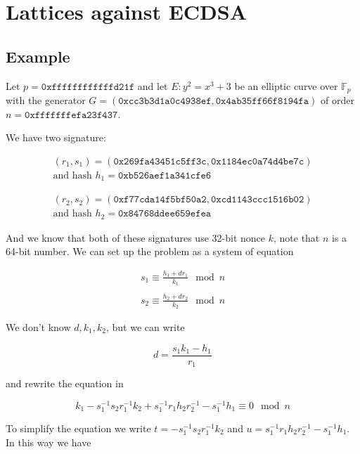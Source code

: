 \documentclass[a4paper,12pt]{report}
\newcommand{\F}{\mathbb{F}}
\begin{document}
\section{Lattices against ECDSA}

\subsection{Example}

Let $p = \texttt{0xffffffffffffd21f}$ and let $E: y^2 = x^3 + 3$ be an elliptic curve over $\F_p$ with the generator
$G = (\texttt{0xcc3b3d1a0c4938ef}, \texttt{0x4ab35ff66f8194fa})$ of order $n = \texttt{0xfffffffefa23f437}$.

\vspace*{10px}

We have two signature:

\[
    \begin{array}{c}
        (r_1, s_1) = (\texttt{0x269fa43451c5ff3c}, \texttt{0x1184ec0a74d4be7c}) \\
        \text{and hash } h_1 = \texttt{0xb526aef1a341cfe6}
    \end{array}
\]

\[
    \begin{array}{c}
        (r_2, s_2) = (\texttt{0xf77cda14f5bf50a2}, \texttt{0xcd1143ccc1516b02}) \\ 
        \text{and hash } h_2 = \texttt{0x84768ddee659efea}
    \end{array}
\]

And we know that both of these signatures use 32-bit nonce $k$, note that $n$ is a 64-bit number. We can set up the problem as a system of equation

\[
    \begin{array}{c}
        s_1 \equiv \displaystyle\frac{h_1 + dr_1}{k_1} \mod n \\ \\ 
        s_2 \equiv \displaystyle\frac{h_2 + dr_2}{k_2} \mod n
    \end{array}
\]

We don't know $d, k_1, k_2$, but we can write 

\[
    d = \displaystyle\frac{s_1k_1 - h_1}{r_1}
\]

and rewrite the equation in

\[
    k_1 - s_1^{-1}s_2r_1^{-1}k_2 + s_1^{-1}r_1h_2r_2^{-1} - s_1^{-1}h_1 \equiv 0 \mod n
\]

To simplify the equation we write $t = - s_1^{-1}s_2r_1^{-1}k_2$ and $u = s_1^{-1}r_1h_2r_2^{-1} - s_1^{-1}h_1$. In this way we have
\end{document}
